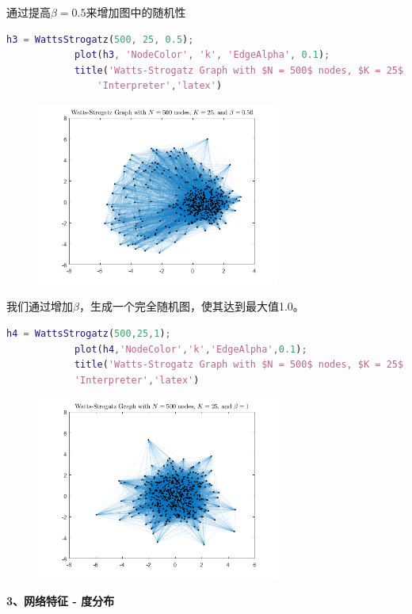             \par
            通过提高$\beta = 0.5$来增加图中的随机性
            \begin{lstlisting}[language=Matlab]
            h3 = WattsStrogatz(500, 25, 0.5);
            plot(h3, 'NodeColor', 'k', 'EdgeAlpha', 0.1);
            title('Watts-Strogatz Graph with $N = 500$ nodes, $K = 25$, and $\beta = 0.50$', ...
                'Interpreter','latex')
             \end{lstlisting}
            \begin{figure}[H]
            \centering
            \includegraphics[height=6cm]{images/38.jpg}
            \end{figure}
            我们通过增加$\beta$，生成一个完全随机图，使其达到最大值1.0。
            \begin{lstlisting}[language=Matlab]
            h4 = WattsStrogatz(500,25,1);
            plot(h4,'NodeColor','k','EdgeAlpha',0.1);
            title('Watts-Strogatz Graph with $N = 500$ nodes, $K = 25$, and $\beta = 1$', ...
            'Interpreter','latex')
             \end{lstlisting}
            \begin{figure}[H]
            \centering
            \includegraphics[height=6cm]{images/39.jpg}
            \end{figure}
            \textbf{3、网络特征 - 度分布}
